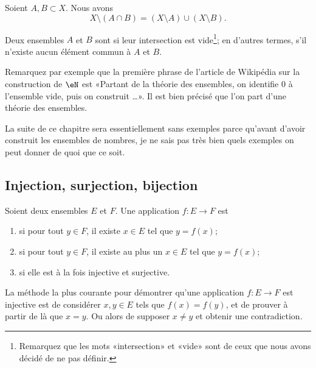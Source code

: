 \begin{lemma}       \label{LEMooHRKAooRskzQL}
    Soient \( A,B\subset X\). Nous avons
    \begin{equation}
        X\setminus(A\cap B)=(X\setminus A)\cup(X\setminus B).
    \end{equation}
\end{lemma}

\begin{definition}\label{DefEnsemblesDisjoints}
    Deux ensembles $A$ et $B$ sont  si leur intersection est vide\footnote{Remarquez que les mots «intersection» et «vide» sont de ceux que nous avons décidé de ne pas définir.}; en d'autres termes, s'il n'existe aucun élément commun à $A$ et $B$.
\end{definition}

\begin{normaltext}
    Remarquez par exemple que la première phrase de l'article de Wikipédia sur la construction de \( \eN\) est «Partant de la théorie des ensembles, on identifie 0 à l'ensemble vide, puis on construit \ldots». Il est bien précisé que l'on part d'une théorie des ensembles.
\end{normaltext}

\begin{normaltext}
    La suite de ce chapitre sera essentiellement sans exemples parce qu'avant d'avoir construit les ensembles de nombres, je ne sais pas très bien quels exemples on peut donner de quoi que ce soit.
\end{normaltext}


\subsection{Injection, surjection, bijection}

\begin{definition}
    Soient deux ensembles \( E\) et \( F\). Une application \( f\colon E\to F\) est
    \begin{enumerate}
        \item
             si pour tout \( y\in F\), il existe \( x\in E\) tel que \( y=f(x)\);
        \item
             si pour tout \( y\in F\), il existe au plus un \(x\in E \) tel que \( y=f(x)\);
        \item
             si elle est à la fois injective et surjective.
    \end{enumerate}
\end{definition}
La méthode la plus courante pour démontrer qu'une application \( f\colon E\to F\) est injective est de considérer \( x,y\in E\) tels que \( f(x)=f(y)\), et de prouver à partir de là que \( x=y\). Ou alors de supposer \( x\neq y\) et obtenir une contradiction.

